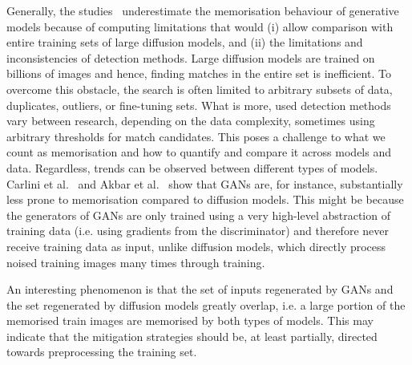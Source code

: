 \documentclass[conference]{IEEEtran}
\begin{document}
Generally, the studies~\cite{somepalli_diffusion_2022, somepalli_understanding_2023, carlini_extracting_2023, carlini_extracting_2021} underestimate the memorisation behaviour of generative models because of computing limitations that would (i) allow comparison with entire training sets of large diffusion models, and (ii) the limitations and inconsistencies of detection methods. %
Large diffusion models are trained on billions of images and hence, finding matches in the entire set is inefficient. To overcome this obstacle, the search is often limited to arbitrary subsets of data, duplicates, outliers, or fine-tuning sets. What is more, used detection methods vary between research, depending on the data complexity, sometimes using arbitrary thresholds for match candidates. This poses a challenge to what we count as memorisation and how to quantify and compare it across models and data.
Regardless, trends can be observed between different types of models. Carlini et al.~\cite{carlini_extracting_2023} and Akbar et al.~\cite{akbar_beware_2023} show that GANs are, for instance, substantially less prone to memorisation compared to diffusion models.
This might be because the generators of GANs are only trained using a very high-level abstraction of training data (i.e. using gradients from the discriminator) and therefore never receive training data as input, unlike diffusion models, which directly process noised training images many times through training.

An interesting phenomenon is that the set of inputs regenerated by GANs and the set regenerated by diffusion models greatly overlap, i.e. a large portion of the memorised train images are memorised by both types of models. This may 
indicate that the mitigation strategies should be, at least partially, directed towards preprocessing the training set.%
\end{document}
